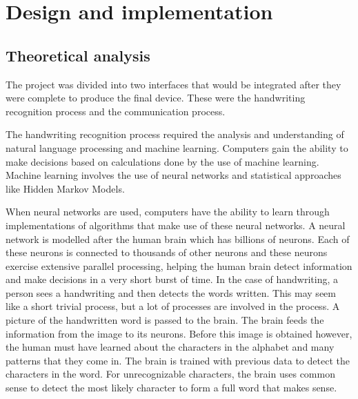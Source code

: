 
\section{Design and implementation}


\subsection{Theoretical analysis}

The project was divided into two interfaces that would be integrated after they were complete to produce the final device. These were the handwriting recognition process and the communication process.

The handwriting recognition process required the analysis and understanding of natural language processing and machine learning. Computers gain the ability to make decisions based on calculations done by the use of machine learning. Machine learning involves the use of neural networks and statistical approaches like Hidden Markov Models.

When neural networks are used, computers have the ability to learn through implementations of algorithms that make use of these neural networks. A neural network is modelled after the human brain which has billions of neurons. Each of these neurons is connected to thousands of other neurons and these neurons exercise extensive parallel processing, helping the human brain detect information and make decisions in a very short burst of time. In the case of handwriting, a person sees a handwriting and then detects the words written. This may seem like a short trivial process, but a lot of processes are involved in the process. A picture of the handwritten word is passed to the brain. The brain feeds the information from the image to its neurons. Before this image is obtained however, the human must have learned about the characters in the alphabet and many patterns that they come in. The brain is trained with previous data to detect the characters in the word. For unrecognizable characters, the brain uses common sense to detect the most likely character to form a full word that makes sense. 

